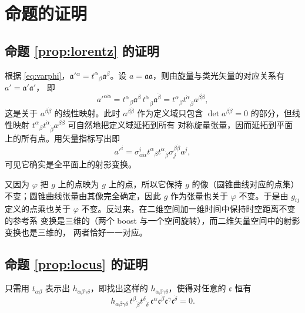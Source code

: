 \section{命题的证明}

\subsection{命题 \ref{prop:lorentz} 的证明}

根据 \eqref{eq:varphi}，$\mathfrak a'{}^\alpha=t^\alpha{}_\beta\mathfrak a^\beta$。设
$a=\mathfrak a\mathfrak a$，则由旋量与类光矢量的对应关系有 $a'=\mathfrak a'\mathfrak a'$，
即
\[
a'^{\alpha\dot\alpha}
=t^\alpha{}_\beta\mathfrak a^\beta\,
t^{\dot\alpha}{}_{\dot\beta}\mathfrak a^{\dot\beta}
=t^\alpha{}_\beta t^{\dot\alpha}{}_{\dot\beta}a^{\beta\dot\beta},
\]
这是关于 $a^{\beta\dot\beta}$ 的线性映射。此时 $a^{\beta\dot\beta}$ 作为定义域只包含
$\det a^{\beta\dot\beta}=0$ 的部分，但线性映射
$t^\alpha{}_\beta t^{\dot\alpha}{}_{\dot\beta}a^{\beta\dot\beta}$ 可自然地把定义域延拓到所有
对称旋量张量，因而延拓到平面上的所有点。用矢量指标写出即
\[
a'^i=\sigma^i_{\alpha\dot\alpha}t^\alpha{}_\beta t^{\dot\alpha}{}_{\dot\beta}
\sigma_j^{\beta\dot\beta}a^j,
\]
可见它确实是全平面上的射影变换。

又因为 $\varphi$ 把 $g$ 上的点映为 $g$ 上的点，所以它保持 $g$ 的像（圆锥曲线对应的点集）
不变；圆锥曲线张量由其像完全确定，因此 $g$ 作为张量也关于 $\varphi$ 不变。于是由 $g_{ij}$
定义的点乘也关于 $\varphi$ 不变。反过来，在二维空间加一维时间中保持时空距离不变的参考系
变换是三维的（两个 boost 与一个空间旋转），而二维矢量空间中的射影变换也是三维的，
两者恰好一一对应。

\subsection{命题 \ref{prop:locus} 的证明}

只需用 $t_{\alpha\beta}$ 表示出 $h_{\alpha\beta\gamma\delta}$，即找出这样的
$h_{\alpha\beta\gamma\delta}$，使得对任意的 $\mathfrak c$ 恒有
\begin{equation}\label{eq:hlocus}
h_{\alpha\beta\gamma\delta}\,
t^\beta{}_{\dot\beta}t^\delta{}_{\dot\delta}\,
\mathfrak c^\alpha\mathfrak c^{\dot\beta}\mathfrak c^\gamma\mathfrak c^{\dot\delta}=0 .
\end{equation}

